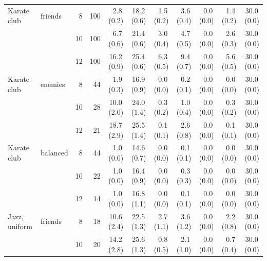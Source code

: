 \begin{table}[p]
{\begin{tabular}{llrrrrrrrrr}
\midrule
Karate club & friends & 8 & 100 & 2.8\,{\scriptsize(0.2)} & 18.2\,{\scriptsize(0.6)} & 1.5\,{\scriptsize(0.2)} & 3.6\,{\scriptsize(0.4)} & 0.0\,{\scriptsize(0.0)} & 1.4\,{\scriptsize(0.2)} & 30.0\,{\scriptsize(0.0)} \\
 &  & 10 & 100 & 6.7\,{\scriptsize(0.6)} & 21.4\,{\scriptsize(0.6)} & 3.0\,{\scriptsize(0.4)} & 4.7\,{\scriptsize(0.5)} & 0.0\,{\scriptsize(0.0)} & 2.6\,{\scriptsize(0.3)} & 30.0\,{\scriptsize(0.0)} \\
 &  & 12 & 100 & 16.2\,{\scriptsize(0.9)} & 25.4\,{\scriptsize(0.6)} & 6.3\,{\scriptsize(0.5)} & 9.4\,{\scriptsize(0.7)} & 0.0\,{\scriptsize(0.0)} & 5.6\,{\scriptsize(0.5)} & 30.0\,{\scriptsize(0.0)} \\
\addlinespace[1pt]
Karate club & enemies & 8 & 44 & 1.9\,{\scriptsize(0.3)} & 16.9\,{\scriptsize(0.9)} & 0.0\,{\scriptsize(0.0)} & 0.2\,{\scriptsize(0.1)} & 0.0\,{\scriptsize(0.0)} & 0.0\,{\scriptsize(0.0)} & 30.0\,{\scriptsize(0.0)} \\
 &  & 10 & 28 & 10.0\,{\scriptsize(2.0)} & 24.0\,{\scriptsize(1.4)} & 0.3\,{\scriptsize(0.2)} & 1.0\,{\scriptsize(0.4)} & 0.0\,{\scriptsize(0.0)} & 0.3\,{\scriptsize(0.2)} & 30.0\,{\scriptsize(0.0)} \\
 &  & 12 & 21 & 18.7\,{\scriptsize(2.9)} & 25.5\,{\scriptsize(1.4)} & 0.1\,{\scriptsize(0.1)} & 2.6\,{\scriptsize(0.8)} & 0.0\,{\scriptsize(0.0)} & 0.1\,{\scriptsize(0.1)} & 30.0\,{\scriptsize(0.0)} \\
\addlinespace[1pt]
Karate club & balanced & 8 & 44 & 1.0\,{\scriptsize(0.0)} & 14.6\,{\scriptsize(0.7)} & 0.0\,{\scriptsize(0.0)} & 0.1\,{\scriptsize(0.1)} & 0.0\,{\scriptsize(0.0)} & 0.0\,{\scriptsize(0.0)} & 30.0\,{\scriptsize(0.0)} \\
 &  & 10 & 22 & 1.0\,{\scriptsize(0.0)} & 16.4\,{\scriptsize(0.9)} & 0.0\,{\scriptsize(0.0)} & 0.3\,{\scriptsize(0.3)} & 0.0\,{\scriptsize(0.0)} & 0.0\,{\scriptsize(0.0)} & 30.0\,{\scriptsize(0.0)} \\
 &  & 12 & 14 & 1.0\,{\scriptsize(0.0)} & 16.8\,{\scriptsize(1.1)} & 0.0\,{\scriptsize(0.0)} & 0.1\,{\scriptsize(0.1)} & 0.0\,{\scriptsize(0.0)} & 0.0\,{\scriptsize(0.0)} & 30.0\,{\scriptsize(0.0)} \\
\midrule
Jazz, uniform & friends & 8 & 18 & 10.6\,{\scriptsize(2.4)} & 22.5\,{\scriptsize(1.3)} & 2.7\,{\scriptsize(1.1)} & 3.6\,{\scriptsize(1.2)} & 0.0\,{\scriptsize(0.0)} & 2.2\,{\scriptsize(0.8)} & 30.0\,{\scriptsize(0.0)} \\
 &  & 10 & 20 & 14.2\,{\scriptsize(2.8)} & 25.6\,{\scriptsize(1.3)} & 0.8\,{\scriptsize(0.5)} & 2.1\,{\scriptsize(1.0)} & 0.0\,{\scriptsize(0.0)} & 0.7\,{\scriptsize(0.4)} & 30.0\,{\scriptsize(0.0)} \\

\end{tabular}}
\end{table}

